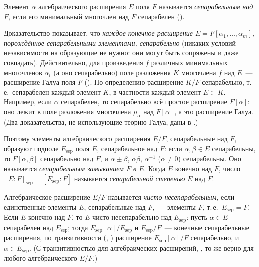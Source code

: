 \begin{remark}[3.15]
Элемент $\alpha$ алгебраического расширения $E$ поля $F$ называется \emph{сепарабельным над $F$}, если его минимальный
многочлен над $F$ сепарабелен ().

Доказательство  показывает, что \emph{каждое конечное расширение $E=F[\alpha_1,\dots,\alpha_m]$, порождённое
сепарабельными элементами, сепарабельно} (никаких условий независимости на образующие не нужно: они могут быть
сопряжены и даже совпадать). Действительно, для произведения $f$ различных минимальных многочленов
$\alpha_i$ (а оно сепарабельно) поле разложения $K$ многочлена $f$ над $E$~--- расширение Галуа поля $F$ (). По
определению  расширение $K/F$ сепарабельно, т.\,е.\ сепарабелен каждый элемент $K$, в частности каждый элемент
$E\subset K$. Например, если $\alpha$ сепарабелен, то сепарабельно всё простое расширение $F[\alpha]$: оно лежит в поле
разложения многочлена $\mu_\alpha$ над $F[\alpha]$, а это расширение Галуа. (Два доказательства, не использующие теорию
Галуа, даны в .)

Поэтому элементы алгебраического расширения $E/F$, сепарабельные над $F$, образуют подполе $E_{\mathrm{sep}}$ поля $E$,
сепарабельное над $F$: если $\alpha,\beta\in E$ сепарабельны, то $F[\alpha,\beta]$ сепарабельно над $F$, и
$\alpha\pm\beta$, $\alpha\beta$, $\alpha^{-1}$ ($\alpha\ne0$) сепарабельны. Оно называется \emph{сепарабельным замыканием $F$ в $E$}.
Когда $E$ конечно над $F$, число $[E:F]_{\mathrm{sep}}=[E_{\mathrm{sep}}:F]$ называется \emph{сепарабельной степенью} $E$
над $F$.

Алгебраическое расширение $E/F$ называется \emph{чисто несепарабельным}, если единственные элементы $E$, сепарабельные
над $F$,~--- элементы $F$, т.\,е.\ $E_{\mathrm{sep}}=F$. Если $E$ конечно над $F$, то $E$ чисто несепарабельно над
$E_{\mathrm{sep}}$: пусть $\alpha\in E$ сепарабелен над $E_{\mathrm{sep}}$; тогда $E_{\mathrm{sep}}[\alpha]/E_{\mathrm{sep}}$ и
$E_{\mathrm{sep}}/F$~--- конечные сепарабельные расширения, по транзитивности (, ) расширение
$E_{\mathrm{sep}}[\alpha]/F$ сепарабельно, и $\alpha\in E_{\mathrm{sep}}$. (С транзитивностью для алгебраических расширений,
, то же верно для любого алгебраического $E/F$.)
\end{remark}

